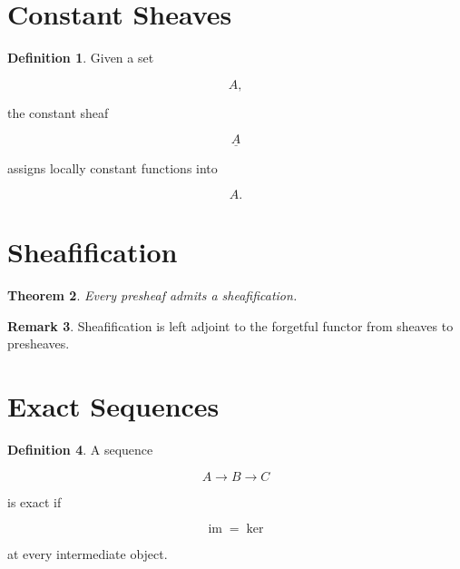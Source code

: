 \documentclass[11pt]{book}
\numberwithin{equation}{chapter}
\theoremstyle{definition}
\newtheorem{definition}{Definition}[chapter]
\newtheorem{remark}[definition]{Remark}
\theoremstyle{plain}
\newtheorem{theorem}[definition]{Theorem}
\begin{document}

\section{Constant Sheaves}

\begin{definition}

Given a set

\[
A,
\]

the constant sheaf

\[
\underline{A}
\]

assigns locally constant functions into

\[
A.
\]

\end{definition}


\section{Sheafification}

\begin{theorem}

Every presheaf admits a sheafification.

\end{theorem}


\begin{remark}

Sheafification is left adjoint to the forgetful functor from sheaves to
presheaves.

\end{remark}


\section{Exact Sequences}

\begin{definition}

A sequence

\[
A
\rightarrow
B
\rightarrow
C
\]

is exact if

\[
\operatorname{im}
=
\ker
\]

at every intermediate object.

\end{definition}
\end{document}

